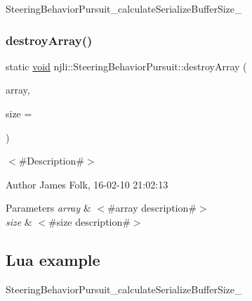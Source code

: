 \begin{DoxyCodeInclude}
\end{DoxyCodeInclude}
Steering\+Behavior\+Pursuit\+\_\+calculate\+Serialize\+Buffer\+Size\+\_\+ \mbox{\label{classnjli_1_1_steering_behavior_pursuit_ada097ed44a5a94d9ca39f15b60ee01ef}} 
\subsubsection{\texorpdfstring{destroy\+Array()}{destroyArray()}}
{\footnotesize\ttfamily static \mbox{\hyperlink{_thread_8h_af1e856da2e658414cb2456cb6f7ebc66}{void}} njli\+::\+Steering\+Behavior\+Pursuit\+::destroy\+Array (\begin{DoxyParamCaption}\item[{\mbox{\hyperlink{classnjli_1_1_steering_behavior_pursuit}{Steering\+Behavior\+Pursuit}} $\ast$$\ast$}]{array,  }\item[{const \mbox{\hyperlink{_util_8h_a10e94b422ef0c20dcdec20d31a1f5049}{u32}}}]{size = {} }\end{DoxyParamCaption})\hspace{0.3cm}{\ttfamily [static]}}



$<$\#\+Description\#$>$ 

\begin{DoxyAuthor}{Author}
James Folk, 16-\/02-\/10 21\+:02\+:13
\end{DoxyAuthor}

\begin{DoxyParams}{Parameters}
{\em array} & $<$\#array description\#$>$ \\
\hline
{\em size} & $<$\#size description\#$>$\\
\hline
\end{DoxyParams}
\hypertarget{classnjli_1_1_steering_behavior_wander_ex1}{}\subsection{Lua example}\label{classnjli_1_1_steering_behavior_wander_ex1}

\begin{DoxyCodeInclude}
\end{DoxyCodeInclude}
Steering\+Behavior\+Pursuit\+\_\+calculate\+Serialize\+Buffer\+Size\+\_\+ \mbox{\label{classnjli_1_1_steering_behavior_pursuit_ab2c6df1f5f3cd71c736cb01db13af9fd}} 
